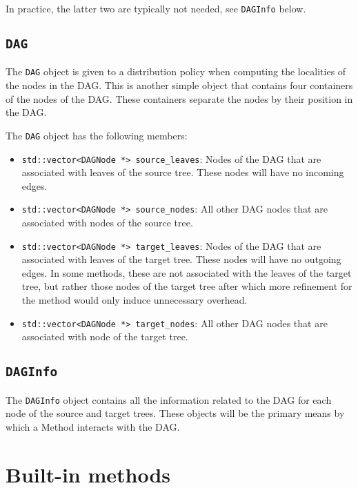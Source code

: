 \noindent In practice, the latter two are typically not needed, see
\texttt{DAGInfo} below.


\subsection{\texttt{DAG}}

The \texttt{DAG} object is given to a distribution policy when computing the
localities of the nodes in the DAG. This is another simple object that contains
four containers of the nodes of the DAG. These containers separate the nodes
by their position in the DAG.

The \texttt{DAG} object has the following members:

\begin{itemize}
  \item \texttt{std::vector<DAGNode *> source_leaves}: Nodes of the DAG that
    are associated with leaves of the source tree. These nodes will have no
    incoming edges.
  \item \texttt{std::vector<DAGNode *> source_nodes}: All other DAG nodes that
    are associated with nodes of the source tree.
  \item \texttt{std::vector<DAGNode *> target_leaves}: Nodes of the DAG that are
    associated with leaves of the target tree. These nodes will have no outgoing
    edges. In some methods, these are not associated with the leaves of the
    target tree, but rather those nodes of the target tree after which more
    refinement for the method would only induce unnecessary overhead.
  \item \texttt{std::vector<DAGNode *> target_nodes}: All other DAG nodes that
    are associated with node of the target tree.
\end{itemize}


\subsection{\texttt{DAGInfo}}

The \texttt{DAGInfo} object contains all the information related to the DAG
for each node of the source and target trees. These objects will be the
primary means by which a Method interacts with the DAG.


\section{Built-in methods}



